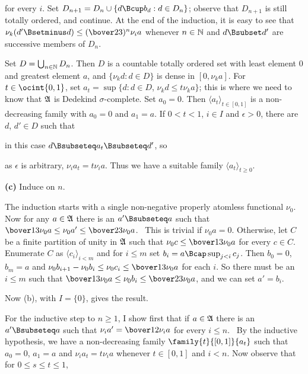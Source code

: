 {\noindent for every $i$.   Set $D_{n+1}=D_n\cup\{d\Bcup b_d:d\in D_n\}$;
observe that $D_{n+1}$ is still totally ordered, and continue.
At the end of the induction,
it is easy to see that $\nu_k(d'\Bsetminus d)\le(\bover23)^n\nu_ia$
whenever $n\in\Bbb N$ and $d\Bsubset d'$ are successive members
of $D_n$.

Set $D=\bigcup_{n\in\Bbb N}D_n$.   Then $D$ is a
countable totally ordered set with
least element $0$ and greatest element $a$, and $\{\nu_kd:d\in D\}$ is
dense in $[0,\nu_ka]$.   For $t\in\ocint{0,1}$, set
$a_t=\sup\{d:d\in D$, $\nu_kd\le t\nu_ka\}$;  this is where we need to know
that $\frak A$ is Dedekind $\sigma$-complete.   Set $a_0=0$.
Then $\langle a_t\rangle_{t\in[0,1]}$ is a non-decreasing family with
$a_0=0$ and $a_1=a$.   If $0<t<1$, $i\in I$ and $\epsilon>0$, there are
$d$, $d'\in D$ such that



\noindent in this case $d\Bsubseteq a_t\Bsubseteq d'$, so


\noindent as $\epsilon$ is arbitrary, $\nu_ia_t=t\nu_ia$.   Thus we have a
suitable family $\langle a_t\rangle_{t\ge 0}$.

\medskip

{\bf (c)} Induce on $n$.

\medskip

 The induction starts with a single non-negative
properly atomless functional $\nu_0$.    Now for any $a\in\frak A$ there is
an $a'\Bsubseteq a$ such that $\bover13\nu_0a\le\nu_0a'\le\bover23\nu_0a$.
\Prf\ This is trivial if $\nu_0a=0$.   Otherwise, let $C$ be a
finite partition of unity in $\frak A$ such that $\nu_0c\le\bover13\nu_0a$
for every $c\in C$.   Enumerate $C$ as $\langle c_i\rangle_{i<m}$ and for
$i\le m$ set $b_i=a\Bcap\sup_{j<i}c_j$.   Then $b_0=0$, $b_m=a$ and
$\nu_0b_{i+1}-\nu_0b_i\le\nu_0c_i\le\bover13\nu_0a$ for each $i$.
So there
must be an $i\le m$ such that $\bover13\nu_0a\le\nu_0b_i\le\bover23\nu_0a$,
and we can set $a'=b_i$.\ \Qed

Now (b), with $I=\{0\}$, gives the result.

\medskip

 For the inductive step to $n\ge 1$, I show first that if
$a\in\frak A$ there is an $a'\Bsubseteq a$ such that
$\nu_ia'=\bover12\nu_ia$ for every $i\le n$.   \Prf\ By the inductive
hypothesis, we have a non-decreasing family $\family{t}{[0,1]}{a_t}$ such
that $a_0=0$, $a_1=a$ and $\nu_ia_t=t\nu_ia$ whenever $t\in[0,1]$ and
$i<n$.   Now observe that for $0\le s\le t\le 1$,

}
